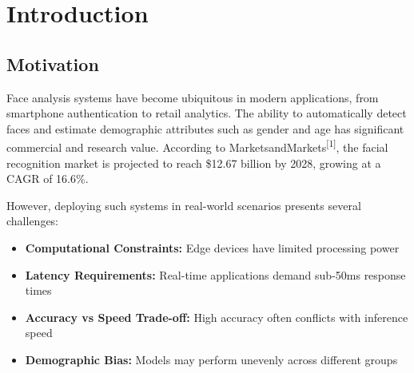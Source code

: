 \documentclass[12pt,a4paper]{article}
\begin{document}
\begin{abstract}
This report presents the design and implementation of a real-time face detection and gender/age estimation system using state-of-the-art deep learning techniques. The system employs a two-stage pipeline architecture: YOLOv11s for face detection achieving 85.2\% mAP on WiderFace benchmark, and a custom MobileNetV3-based classifier trained with Knowledge Distillation and Label Distribution Learning techniques for gender/age estimation, achieving 93-95\% gender accuracy and 70\% age group accuracy. The system operates at 60+ FPS on consumer-grade hardware through various optimization techniques including Dynamic Quantization, JIT compilation, and OpenVINO acceleration. We provide comprehensive comparisons with alternative approaches, detailed mathematical formulations of the training methodology, and analysis of real-world industrial applications of the employed technologies.

\textbf{Keywords:} Face Detection, Gender Estimation, Age Estimation, YOLO, MobileNetV3, Knowledge Distillation, Label Distribution Learning, Real-time Systems
\end{abstract}

\section{Introduction}

\subsection{Motivation}

Face analysis systems have become ubiquitous in modern applications, from smartphone authentication to retail analytics. The ability to automatically detect faces and estimate demographic attributes such as gender and age has significant commercial and research value. According to MarketsandMarkets\textsuperscript{[1]}, the facial recognition market is projected to reach \$12.67 billion by 2028, growing at a CAGR of 16.6\%.

However, deploying such systems in real-world scenarios presents several challenges:

\begin{itemize}[noitemsep]
    \item \textbf{Computational Constraints:} Edge devices have limited processing power
    \item \textbf{Latency Requirements:} Real-time applications demand sub-50ms response times
    \item \textbf{Accuracy vs Speed Trade-off:} High accuracy often conflicts with inference speed
    \item \textbf{Demographic Bias:} Models may perform unevenly across different groups
\end{itemize}
\end{document}
